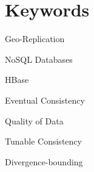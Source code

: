 \section*{Keywords}

{\large %

\noindent Geo-Replication

\noindent NoSQL Databases

\noindent HBase

\noindent Eventual Consistency

\noindent Quality of Data

\noindent Tunable Consistency

\noindent Divergence-bounding

}

\vfill

\cleardoublepage



\pagestyle{plain}



\def\contentsname{Índice}
\tableofcontents
\newpage

\listoffigures
\newpage

\listoftables

\cleardoublepage


